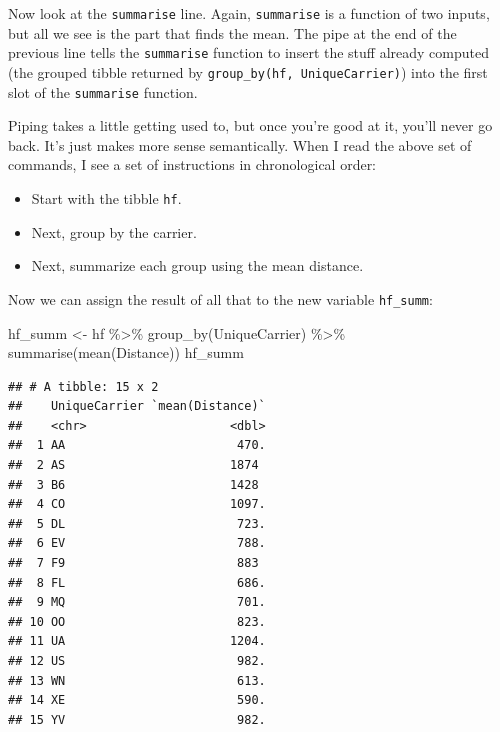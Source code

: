 \documentclass[
]{book}
\newenvironment{Shaded}{\begin{snugshade}}{\end{snugshade}}
\newcommand{\FunctionTok}[1]{\textcolor[rgb]{0.00,0.00,0.00}{#1}}
\newcommand{\NormalTok}[1]{#1}
\newcommand{\OtherTok}[1]{\textcolor[rgb]{0.56,0.35,0.01}{#1}}
\newcommand{\SpecialCharTok}[1]{\textcolor[rgb]{0.00,0.00,0.00}{#1}}
\providecommand{\tightlist}{%
  \setlength{\itemsep}{0pt}\setlength{\parskip}{0pt}}
\begin{document}
Now look at the \texttt{summarise} line. Again, \texttt{summarise} is a function of two inputs, but all we see is the part that finds the mean. The pipe at the end of the previous line tells the \texttt{summarise} function to insert the stuff already computed (the grouped tibble returned by \texttt{group\_by(hf,\ UniqueCarrier)}) into the first slot of the \texttt{summarise} function.

Piping takes a little getting used to, but once you're good at it, you'll never go back. It's just makes more sense semantically. When I read the above set of commands, I see a set of instructions in chronological order:

\begin{itemize}
\tightlist
\item
  Start with the tibble \texttt{hf}.
\item
  Next, group by the carrier.
\item
  Next, summarize each group using the mean distance.
\end{itemize}

Now we can assign the result of all that to the new variable \texttt{hf\_summ}:

\begin{Shaded}
\begin{Highlighting}[]
\NormalTok{hf\_summ }\OtherTok{\textless{}{-}}\NormalTok{ hf }\SpecialCharTok{\%\textgreater{}\%}
    \FunctionTok{group\_by}\NormalTok{(UniqueCarrier) }\SpecialCharTok{\%\textgreater{}\%}
    \FunctionTok{summarise}\NormalTok{(}\FunctionTok{mean}\NormalTok{(Distance))}
\NormalTok{hf\_summ}
\end{Highlighting}
\end{Shaded}

\begin{verbatim}
## # A tibble: 15 x 2
##    UniqueCarrier `mean(Distance)`
##    <chr>                    <dbl>
##  1 AA                        470.
##  2 AS                       1874 
##  3 B6                       1428 
##  4 CO                       1097.
##  5 DL                        723.
##  6 EV                        788.
##  7 F9                        883 
##  8 FL                        686.
##  9 MQ                        701.
## 10 OO                        823.
## 11 UA                       1204.
## 12 US                        982.
## 13 WN                        613.
## 14 XE                        590.
## 15 YV                        982.
\end{verbatim}
\end{document}
